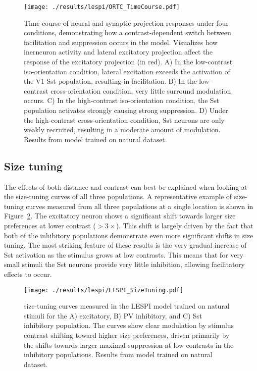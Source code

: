 \begin{figure}
	\centering
    \texttt{[image: ./results/lespi/ORTC\_TimeCourse.pdf]}
	\caption[Time-course of neural and synaptic projection responses
      under four conditions, demonstrating how a contrast-dependent
      switch between facilitation and suppression occurs]{Time-course
      of neural and synaptic projection responses under four
      conditions, demonstrating how a contrast-dependent switch
      between facilitation and suppression occurs in the
      model. Visualizes how inerneuron activity and lateral excitatory
      projection affect the response of the excitatory projection (in
      red). A) In the low-contrast iso-orientation condition, lateral
      excitation exceeds the activation of the V1 Sst population,
      resulting in facilitation. B) In the low-contrast
      cross-orientation condition, very little surround modulation
      occurs. C) In the high-contrast iso-orientation condition, the
      Sst population activates strongly causing strong suppression. D)
      Under the high-contrast cross-orientation condition, Sst neurons
      are only weakly recruited, resulting in a moderate amount of
      modulation.  Results from model trained on natural dataset.}
	\label{ORTC_TimeCourse}
\end{figure}

\subsection{Size tuning}

The effects of both distance and contrast can best be
explained when looking at the size-tuning curves of all three
populations. A representative example of size-tuning curves measured
from all three populations at a single location is shown in
Figure~\ref{LESPI_SizeTuning}. The excitatory neuron shows a
significant shift towards larger size preferences at lower contrast
($>3\times$). This shift is largely driven by the fact that both of
the inhibitory populations demonstrate even more significant shifts in size
tuning. The most striking feature of these results is the very gradual increase
of Sst activation as the stimulus grows at low contrasts. This means
that for very small stimuli the Sst neurons provide very little
inhibition, allowing facilitatory effects to occur.

\begin{figure}
	\centering
        \texttt{[image: ./results/lespi/LESPI\_SizeTuning.pdf]}
	\caption[size-tuning curves of the excitatory, PV, and Sst
      population at various contrasts.]{size-tuning curves measured in
      the LESPI model trained on natural stimuli for the A)
      excitatory, B) PV inhibitory, and C) Sst inhibitory
      population. The curves show clear modulation by stimulus
      contrast shifting toward higher size preferences, driven
      primarily by the shifts towards larger maximal suppression at
      low contrasts in the inhibitory populations. Results from model
      trained on natural dataset.}
	\label{LESPI_SizeTuning}
\end{figure}

